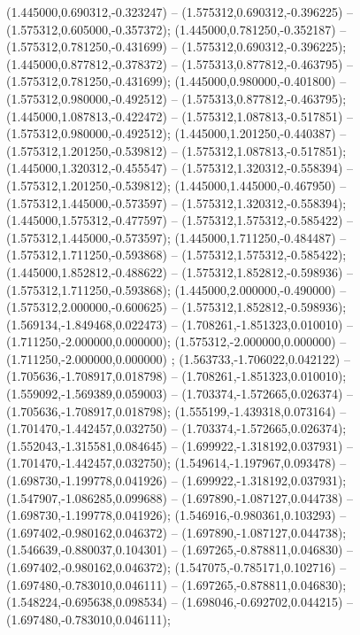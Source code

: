  (1.445000,0.690312,-0.323247) -- (1.575312,0.690312,-0.396225) -- (1.575312,0.605000,-0.357372);
 (1.445000,0.781250,-0.352187) -- (1.575312,0.781250,-0.431699) -- (1.575312,0.690312,-0.396225);
 (1.445000,0.877812,-0.378372) -- (1.575313,0.877812,-0.463795) -- (1.575312,0.781250,-0.431699);
 (1.445000,0.980000,-0.401800) -- (1.575312,0.980000,-0.492512) -- (1.575313,0.877812,-0.463795);
 (1.445000,1.087813,-0.422472) -- (1.575312,1.087813,-0.517851) -- (1.575312,0.980000,-0.492512);
 (1.445000,1.201250,-0.440387) -- (1.575312,1.201250,-0.539812) -- (1.575312,1.087813,-0.517851);
 (1.445000,1.320312,-0.455547) -- (1.575312,1.320312,-0.558394) -- (1.575312,1.201250,-0.539812);
 (1.445000,1.445000,-0.467950) -- (1.575312,1.445000,-0.573597) -- (1.575312,1.320312,-0.558394);
 (1.445000,1.575312,-0.477597) -- (1.575312,1.575312,-0.585422) -- (1.575312,1.445000,-0.573597);
 (1.445000,1.711250,-0.484487) -- (1.575312,1.711250,-0.593868) -- (1.575312,1.575312,-0.585422);
 (1.445000,1.852812,-0.488622) -- (1.575312,1.852812,-0.598936) -- (1.575312,1.711250,-0.593868);
 (1.445000,2.000000,-0.490000) -- (1.575312,2.000000,-0.600625) -- (1.575312,1.852812,-0.598936);
 (1.569134,-1.849468,0.022473) -- (1.708261,-1.851323,0.010010) -- (1.711250,-2.000000,0.000000);
 (1.575312,-2.000000,0.000000) -- (1.711250,-2.000000,0.000000) ;
 (1.563733,-1.706022,0.042122) -- (1.705636,-1.708917,0.018798) -- (1.708261,-1.851323,0.010010);
 (1.559092,-1.569389,0.059003) -- (1.703374,-1.572665,0.026374) -- (1.705636,-1.708917,0.018798);
 (1.555199,-1.439318,0.073164) -- (1.701470,-1.442457,0.032750) -- (1.703374,-1.572665,0.026374);
 (1.552043,-1.315581,0.084645) -- (1.699922,-1.318192,0.037931) -- (1.701470,-1.442457,0.032750);
 (1.549614,-1.197967,0.093478) -- (1.698730,-1.199778,0.041926) -- (1.699922,-1.318192,0.037931);
 (1.547907,-1.086285,0.099688) -- (1.697890,-1.087127,0.044738) -- (1.698730,-1.199778,0.041926);
 (1.546916,-0.980361,0.103293) -- (1.697402,-0.980162,0.046372) -- (1.697890,-1.087127,0.044738);
 (1.546639,-0.880037,0.104301) -- (1.697265,-0.878811,0.046830) -- (1.697402,-0.980162,0.046372);
 (1.547075,-0.785171,0.102716) -- (1.697480,-0.783010,0.046111) -- (1.697265,-0.878811,0.046830);
 (1.548224,-0.695638,0.098534) -- (1.698046,-0.692702,0.044215) -- (1.697480,-0.783010,0.046111);
